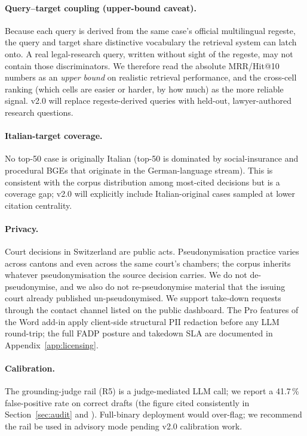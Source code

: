 \documentclass[11pt,a4paper]{article}
\begin{document}
\paragraph{Query--target coupling (upper-bound caveat).} Because each query is derived from the same case's official multilingual regeste, the query and target share distinctive vocabulary the retrieval system can latch onto. A real legal-research query, written without sight of the regeste, may not contain those discriminators. We therefore read the absolute MRR/Hit@10 numbers as an \emph{upper bound} on realistic retrieval performance, and the cross-cell ranking (which cells are easier or harder, by how much) as the more reliable signal. v2.0 will replace regeste-derived queries with held-out, lawyer-authored research questions.

\paragraph{Italian-target coverage.} No top-50 case is originally Italian (top-50 is dominated by social-insurance and procedural BGEs that originate in the German-language stream). This is consistent with the corpus distribution among most-cited decisions but is a coverage gap; v2.0 will explicitly include Italian-original cases sampled at lower citation centrality.

\paragraph{Privacy.} Court decisions in Switzerland are public acts. Pseudonymisation practice varies across cantons and even across the same court's chambers; the corpus inherits whatever pseudonymisation the source decision carries. We do not de-pseudonymise, and we also do not re-pseudonymise material that the issuing court already published un-pseudonymised. We support take-down requests through the contact channel listed on the public dashboard. The Pro features of the Word add-in apply client-side structural PII redaction before any LLM round-trip; the full FADP posture and takedown SLA are documented in Appendix~\ref{app:licensing}.

\paragraph{Calibration.} The grounding-judge rail (R5) is a judge-mediated LLM call; we report a 41.7\,\% false-positive rate on correct drafts (the figure cited consistently in Section~\ref{sec:audit} and ). Full-binary deployment would over-flag; we recommend the rail be used in advisory mode pending v2.0 calibration work.
\end{document}
